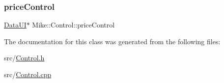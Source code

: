\subsubsection{\texorpdfstring{price\+Control}{priceControl}}
{\footnotesize\ttfamily \hyperlink{class_mike_1_1_control_addbe39ef40982f0a4002b6f74091a799}{Data\+UI}$\ast$ Mike\+::\+Control\+::price\+Control\hspace{0.3cm}{\ttfamily [private]}}



The documentation for this class was generated from the following files\+:\begin{DoxyCompactItemize}
\item 
src/\hyperlink{_control_8h}{Control.\+h}\item 
src/\hyperlink{_control_8cpp}{Control.\+cpp}\end{DoxyCompactItemize}
